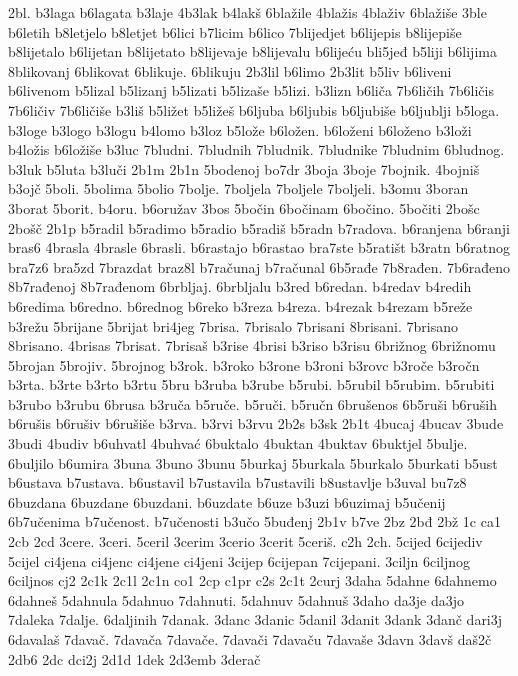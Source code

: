 {2bl.
b3laga
b6lagata
b3laje
4b3lak
b4lakš
6blažile
4blažis
4blaživ
6blažiše
3ble
b6letih
b8letjelo
b8letjet
b6lici
b7licim
b6lico
7blijedjet
b6lijepis
b8lijepiše
b8lijetalo
b6lijetan
b8lijetato
b8lijevaje
b8lijevalu
b6lijeću
bli5jeđ
b5liji
b6lijima
8blikovanj
6blikovat
6blikuje.
6blikuju
2b3lil
b6limo
2b3lit
b5liv
b6liveni
b6livenom
b5lizal
b5lizanj
b5lizati
b5lizaše
b5lizi.
b3lizn
b6liča
7b6ličih
7b6ličis
7b6ličiv
7b6ličiše
b3liš
b5ližet
b5ližeš
b6ljuba
b6ljubis
b6ljubiše
b6ljublji
b5loga.
b3loge
b3logo
b3logu
b4lomo
b3loz
b5lože
b6ložen.
b6loženi
b6loženo
b3loži
b4ložis
b6ložiše
b3luc
7bludni.
7bludnih
7bludnik.
7bludnike
7bludnim
6bludnog.
b3luk
b5luta
b3luči
2b1m
2b1n
5bodenoj
bo7dr
3boja
3boje
7bojnik.
4bojniš
b3ojč
5boli.
5bolima
5bolio
7bolje.
7boljela
7boljele
7boljeli.
b3omu
3boran
3borat
5borit.
b4oru.
b6oružav
3bos
5bočin
6bočinam
6bočino.
5bočiti
2bošc
2bošč
2b1p
b5radil
b5radimo
b5radio
b5radiš
b5radn
b7radova.
b6ranjena
b6ranji
bras6
4brasla
4brasle
6brasli.
b6rastajo
b6rastao
bra7ste
b5ratišt
b3ratn
b6ratnog
bra7z6
bra5zd
7brazdat
braz8l
b7računaj
b7računal
6b5rađe
7b8rađen.
7b6rađeno
8b7rađenoj
8b7rađenom
6brbljaj.
6brbljalu
b3red
b6redan.
b4redav
b4redih
b6redima
b6redno.
b6rednog
b6reko
b3reza
b4reza.
b4rezak
b4rezam
b5reže
b3režu
5brijane
5brijat
bri4jeg
7brisa.
7brisalo
7brisani
8brisani.
7brisano
8brisano.
4brisas
7brisat.
7brisaš
b3rise
4brisi
b3riso
b3risu
6brižnog
6brižnomu
5brojan
5brojiv.
5brojnog
b3rok.
b3roko
b3rone
b3roni
b3rovc
b3roče
b3ročn
b3rta.
b3rte
b3rto
b3rtu
5bru
b3ruba
b3rube
b5rubi.
b5rubil
b5rubim.
b5rubiti
b3rubo
b3rubu
6brusa
b3ruča
b5ruče.
b5ruči.
b5ručn
6brušenos
6b5ruši
b6ruših
b6rušis
b6rušiv
b6rušiše
b3rva.
b3rvi
b3rvu
2b2s
b3sk
2b1t
4bucaj
4bucav
3bude
3budi
4budiv
b6uhvatl
4buhvać
6buktalo
4buktan
4buktav
6buktjel
5bulje.
6buljilo
b6umira
3buna
3buno
3bunu
5burkaj
5burkala
5burkalo
5burkati
b5ust
b6ustava
b7ustava.
b6ustavil
b7ustavila
b7ustavili
b8ustavlje
b3uval
bu7z8
6buzdana
6buzdane
6buzdani.
b6uzdate
b6uze
b3uzi
b6uzimaj
b5učenij
6b7učenima
b7učenost.
b7učenosti
b3učo
5buđenj
2b1v
b7ve
2bz
2bđ
2bž
1c
ca1
2cb
2cd
3cere.
3ceri.
5ceril
3cerim
3cerio
3cerit
5ceriš.
c2h
2ch.
5cijed
6cijediv
5cijel
ci4jena
ci4jenc
ci4jene
ci4jeni
3cijep
6cijepan
7cijepani.
3ciljn
6ciljnog
6ciljnos
cj2
2c1k
2c1l
2c1n
co1
2cp
c1pr
c2s
2c1t
2curj
3daha
5dahne
6dahnemo
6dahneš
5dahnula
5dahnuo
7dahnuti.
5dahnuv
5dahnuš
3daho
da3je
da3jo
7daleka
7dalje.
6daljinih
7danak.
3danc
3danic
5danil
3danit
3dank
3danč
dari3j
6davalaš
7davač.
7davača
7davače.
7davači
7davaču
7davaše
3davn
3davš
daš2č
2db6
2dc
dci2j
2d1d
1dek
2d3emb
3derač
}
